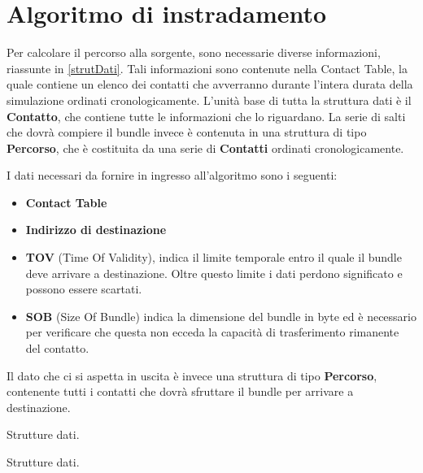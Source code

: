 \documentclass[12pt,a4paper,oneside]{book}
\begin{document}
		\section{Algoritmo di instradamento} \label{algritmInstrad}
		
		Per calcolare il percorso alla sorgente, sono necessarie diverse informazioni, riassunte in  \ref{strutDati}. Tali informazioni sono contenute nella Contact Table, la quale contiene un elenco dei contatti che avverranno durante l'intera durata della simulazione ordinati cronologicamente. L'unità base di tutta la struttura dati è il {\bf Contatto}, che contiene tutte le informazioni che lo riguardano. La serie di salti che dovrà compiere il bundle invece è contenuta in una struttura di tipo {\bf Percorso}, che è costituita da una serie di {\bf Contatti} ordinati cronologicamente. 
		
		I dati necessari da fornire in ingresso all'algoritmo sono i seguenti:
		\begin{itemize}
			\item {\bf Contact Table}
			\item {\bf Indirizzo di destinazione}
			\item {\bf TOV} (Time Of Validity), indica il limite temporale entro il quale il bundle deve arrivare a destinazione. Oltre questo limite i dati perdono significato e possono essere scartati. 
			\item {\bf SOB} (Size Of Bundle) indica la dimensione del bundle in byte ed è necessario per verificare che questa non ecceda la capacità di trasferimento rimanente del contatto.
		\end{itemize}
		
		Il dato che ci si aspetta in uscita è invece una struttura di tipo {\bf Percorso}, contenente tutti i contatti che dovrà sfruttare il bundle per arrivare a destinazione.
		
		\vspace{10pt}
		\begin{algorithm}
			\caption{Strutture dati.}
			
			
			\caption{Strutture dati.}
			\label{strutDati}
		\end{algorithm}
\end{document}

